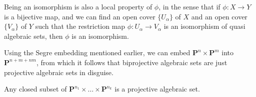 \begin{remark}
    Being an isomorphism is also a local property of $\phi$, in the sense that if $\phi: X \to Y$ is a bijective map, and we can find an open cover $\{ U_\alpha \}$ of $X$ and an open cover $\{ V_\alpha \}$ of $Y$ such that the restriction map $\phi: U_\alpha \to V_\alpha$ is an isomorphism of quasi algebraic sets, then $\phi$ is an isomorphism.
\end{remark}

Using the Segre embedding mentioned earlier, we can embed $\mathbf{P}^n \times \mathbf{P}^m$ into $\mathbf{P}^{n + m + nm}$, from which it follows that biprojective algebraic sets are just projective algebraic sets in disguise.

\begin{theorem}
    Any closed subset of $\mathbf{P}^{n_1} \times \dots \times \mathbf{P}^{n_k}$ is a projective algebraic set.
\end{theorem}
